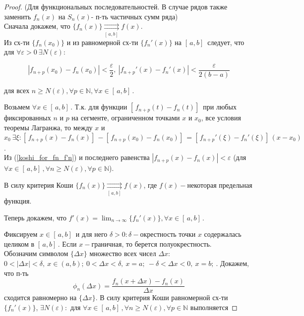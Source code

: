 \begin{proof} (Для функциональных последовательностей. В случае рядов также заменить $f_n(x)$ на $S_n(x)$- п-ть частичных сумм ряда) \\
    Сначала докажем, что $\{f_n(x)\} \underset{[\,a,b]\, }{\rightrightarrows}f(x)$. \\
    Из сх-ти $\{f_n(x_0)\}$ и из равномерной сх-ти $\{f_n'(x)\}$ на $[\,a,b]\,$ следует, что для $\forall \varepsilon > 0 \ \exists N(\varepsilon):$

    \begin{equation}\label{koshi_for_fn_f'n}
        |f_{n+p}(x_0) - f_n(x_0)| < \frac{\varepsilon}{2},\ |f_{n+p}'(x) - f_n'(x)| < \frac{\varepsilon}{2(b-a)}
    \end{equation}

    для всех $n \ge N(\varepsilon), \forall p \in \mathbb{N}, \forall x \in [\,a,b]\,$.

    Возьмем $\forall x \in [\,a,b]\,$. Т.к. для функции $[\,f_{n+p}(t) - f_n(t)]\,$ при любых фиксированных $n$ и $p$ на сегменте, ограниченном точками $x$ и $x_0$, все условия теоремы Лагранжа, то между $x$ и $x_0 \ \exists \xi: [\,f_{n+p}(x) - f_n(x)]\, - [\,f_{n+p}(x_0) - f_n(x_0)]\, = [\,f_{n+p}'(\xi) - f_n'(\xi)]\,(x-x_0)$. \\

    Из (\ref{koshi_for_fn_f'n}) и последнего равенства $|f_{n+p}(x) - f_n(x)| < \varepsilon$ (для $\forall x \in [\,a,b]\,, \forall n \ge N(\varepsilon), \forall p \in \mathbb{N}$).
    
    В силу критерия Коши $\{f_n(x)\} \underset{[\,a,b]\, }{\rightrightarrows}f(x)$, где $f(x)-$некоторая предельная функция.

    Теперь докажем, что $f'(x) = \lim_{n \rightarrow \infty}{\{f_n'(x)\}}, \forall x \in [\,a,b]\,$.

    Фиксируем $x \in [\,a,b]\,$ и для него $\delta > 0: \delta-$окрестность точки $x$ содержалась целиком в $[\,a,b]\,$. Если $x-$граничная, то берется полуокрестность. \\

    Обозначим символом $\{\Delta x\}$ множество всех чисел $\Delta x$: $0 < |\Delta x| < \delta, \ x \in (a, b);\ 0 < \Delta x < \delta, \ x = a;\ -\delta < \Delta x < 0, \ x = b;\ $.
    Докажем, что п-ть
    \begin{equation}\label{phi_functions}
        \phi_n(\Delta x) = \frac{f_n(x + \Delta x) - f_n(x)}{\Delta x}
    \end{equation}
    сходится равномерно на $\{\Delta x\}$.
    В силу критерия Коши равномерной сх-ти $\{f_n'(x)\}$, $\exists N(\varepsilon):$ для $\forall x \in [\,a,b]\,, \forall n \ge N(\varepsilon), \forall p \in \mathbb{N}$ выполняется


\end{proof}
